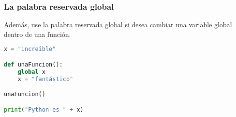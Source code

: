 \begin{frame}[fragile]
  \frametitle{La palabra reservada \textbf{global}}

  Además, use la palabra reservada \textcolor{codeKeyword}{global} si desea
  cambiar una variable global dentro de una función.

  \vspace{\baselineskip}
  \begin{lstlisting}[language=Python]
x = "increíble"

def unaFuncion():
    global x
    x = "fantástico"

unaFuncion()

print("Python es " + x)
  \end{lstlisting}
\end{frame}
